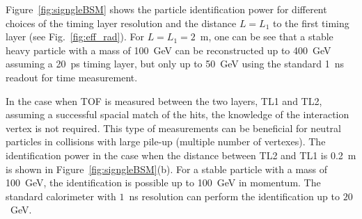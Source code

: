Figure~\ref{fig:signgleBSM} shows the particle identification power for different choices of the timing layer resolution
and the distance $L=L_1$ to the first timing layer (see Fig.~\ref{fig:eff_rad}).
For $L=L_1=2$~m, one can be see that a stable heavy particle with a mass of 100~GeV can be reconstructed up to 
400~GeV assuming a 20~ps timing layer,
but only up to 50~GeV using the standard 1~ns readout for time measurement.

In the case when  TOF is measured between the two layers, TL1 and TL2, assuming a successful spacial match of the hits,
the knowledge of the interaction vertex is not required.
This type of measurements can be beneficial
for neutral particles in collisions with large pile-up (multiple number of vertexes).
The identification power in the case when the distance between TL2 and TL1 is 0.2~m is shown in Figure~\ref{fig:signgleBSM}(b).
For a stable particle with a mass of 100~GeV, the identification is possible up to 100~GeV in momentum. The standard calorimeter with
$1$~ns resolution can perform the identification up to $20$~GeV. 

